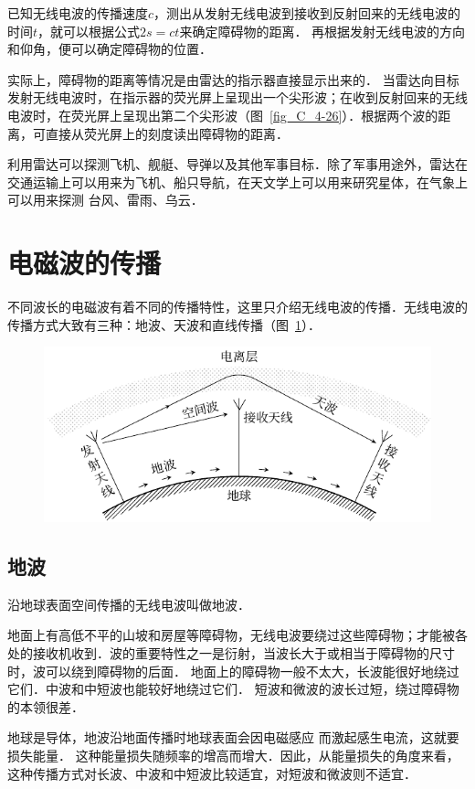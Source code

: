 已知无线电波的传播速度$c$，测出从发射无线电波到接收到反射回来的无线电波的时间$t$，就可以根据公式$2s=ct$来确定障碍物的距离．
再根据发射无线电波的方向和仰角，便可以确定障碍物的位置．

实际上，障碍物的距离等情况是由雷达的指示器直接显示出来的．
当雷达向目标发射无线电波时，在指示器的荧光屏上呈现出一个尖形波；在收到反射回来的无线电波时，在荧光屏上呈现出第二个尖形波（图~\ref{fig_C_4-26}）．根据两个波的距离，可直接从荧光屏上的刻度读出障碍物的距离．


利用雷达可以探测飞机、舰艇、导弹以及其他军事目标．除了军事用途外，雷达在交通运输上可以用来为飞机、船只导航，在天文学上可以用来研究星体，在气象上可以用来探测
台风、雷雨、乌云．

\section{电磁波的传播}
不同波长的电磁波有着不同的传播特性，这里只介绍无线电波的传播．无线电波的传播方式大致有三种：地波、天波和直线传播（图~\ref{fig_C_4-27}）．
\begin{figure}[htbp]
    \centering
    \includegraphics{fig/C/4-27.pdf}
    \caption{}\label{fig_C_4-27}
\end{figure}

\subsection{地波}

沿地球表面空间传播的无线电波叫做地波．

地面上有高低不平的山坡和房屋等障碍物，无线电波要绕过这些障碍物；才能被各处的接收机收到．波的重要特性之一是衍射，当波长大于或相当于障碍物的尺寸时，波可以绕到障碍物的后面．
地面上的障碍物一般不太大，长波能很好地绕过它们．中波和中短波也能较好地绕过它们．
短波和微波的波长过短，绕过障碍物的本领很差．

地球是导体，地波沿地面传播时地球表面会因电磁感应
而激起感生电流，这就要损失能量．
这种能量损失随频率的增高而增大．因此，从能量损失的角度来看，这种传播方式对长波、中波和中短波比较适宜，对短波和微波则不适宜．

